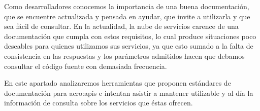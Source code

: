 Como desarrolladores conocemos la importancia de una buena documentación, que se encuentre actualizada y pensada en ayudar, que invite a utilizarla y que sea fácil de consultar. En la actualidad, la nube de servicios carence de una documentación que cumpla con estos requisitos, lo cual produce situaciones poco deseables para quienes utilizamos sus servicios, ya que esto sumado a la falta de consistencia en las respuestas y los parámetros admitidos hacen que debamos consultar el código fuente con demasiada frecuencia.

En este apartado analizaremos herramientas que proponen estándares de documentación para \glspl{acro:api} e intentan asistir a mantener utilizable y al día la información de consulta sobre los servicios que éstas ofrecen.
